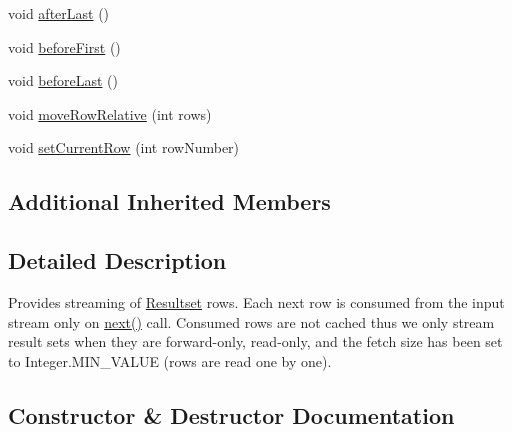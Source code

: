 \begin{DoxyCompactItemize}
\item 
void \mbox{\hyperlink{classcom_1_1mysql_1_1cj_1_1protocol_1_1a_1_1result_1_1_resultset_rows_streaming_af58c1ee8e6bddf5ef73508bc9292a0a2}{after\+Last}} ()
\item 
void \mbox{\hyperlink{classcom_1_1mysql_1_1cj_1_1protocol_1_1a_1_1result_1_1_resultset_rows_streaming_a09c61e1550747c9af885193ffe222c04}{before\+First}} ()
\item 
void \mbox{\hyperlink{classcom_1_1mysql_1_1cj_1_1protocol_1_1a_1_1result_1_1_resultset_rows_streaming_a11ccbda4e0c40207c02253c5a2931748}{before\+Last}} ()
\item 
void \mbox{\hyperlink{classcom_1_1mysql_1_1cj_1_1protocol_1_1a_1_1result_1_1_resultset_rows_streaming_a737e87ca2de64978c94ecd245f1b9cf4}{move\+Row\+Relative}} (int rows)
\item 
void \mbox{\hyperlink{classcom_1_1mysql_1_1cj_1_1protocol_1_1a_1_1result_1_1_resultset_rows_streaming_ac2448082c41dad09ccd418eaf3f400e0}{set\+Current\+Row}} (int row\+Number)
\end{DoxyCompactItemize}
\subsection*{Additional Inherited Members}


\subsection{Detailed Description}
Provides streaming of \mbox{\hyperlink{interfacecom_1_1mysql_1_1cj_1_1protocol_1_1_resultset}{Resultset}} rows. Each next row is consumed from the input stream only on \mbox{\hyperlink{classcom_1_1mysql_1_1cj_1_1protocol_1_1a_1_1result_1_1_resultset_rows_streaming_a2150a98917c9542a703991059ebd369f}{next()}} call. Consumed rows are not cached thus we only stream result sets when they are forward-\/only, read-\/only, and the fetch size has been set to Integer.\+M\+I\+N\+\_\+\+V\+A\+L\+UE (rows are read one by one). 

\subsection{Constructor \& Destructor Documentation}
\mbox{\label{classcom_1_1mysql_1_1cj_1_1protocol_1_1a_1_1result_1_1_resultset_rows_streaming_a2fd06d15f9d59ed1e807189b556357f4}} 
